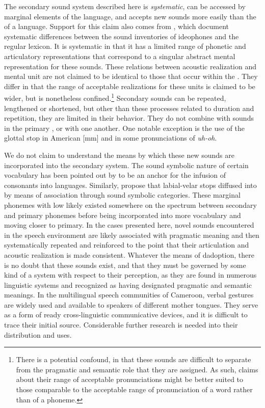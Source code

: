 \documentclass[output=paper
,newtxmath
,modfonts
,nonflat]{langsci/langscibook}
\begin{document}
The secondary sound system described here is \textit{systematic}, can be accessed by marginal elements of the language, and accepts new sounds more easily than the  of a language. Support for this claim also comes from \citet{nuckollsetal2016}, which document systematic differences between the sound inventories of  ideophones and the regular lexicon. It is systematic in that it has a limited range of phonetic and articulatory representations that correspond to a singular abstract mental representation for these sounds. These relations between acoustic realization and mental unit are not claimed to be identical to those that occur within the . They differ in that the range of acceptable realizations for these units is claimed to be wider, but is nonetheless confined.\footnote{There is a potential confound, in that these sounds are difficult to separate from the pragmatic and semantic role that they are assigned. As such, claims about their range of acceptable pronunciations might be better suited to those comparable to the acceptable range of pronunciation of a word rather than of a phoneme.} Secondary sounds can be repeated, lengthened or shortened, but other than these processes related to duration and repetition, they are limited in their behavior. They do not combine with sounds in the primary , or with one another. One notable exception is the use of the glottal stop in American  [\textglotstop m\textglotstop m] and in some pronunciations of \textit{uh-oh}.

We do not claim to understand the means by which these new sounds are incorporated into the secondary system. The sound symbolic nature of certain vocabulary has been pointed out by \citet{BostoenSands2012} to be an anchor for the infusion of  consonants into  languages. Similarly, \citet{BostoenDonzo2013} propose that labial-velar stops diffused into  by means of association through sound symbolic categories. These marginal phonemes with low  likely existed somewhere on the spectrum between secondary and primary phonemes before being incorporated into more vocabulary and moving closer to primary. In the cases presented here, novel sounds encountered in the speech environment are likely associated with pragmatic meaning and then systematically repeated and reinforced to the point that their articulation and acoustic realization is made consistent. Whatever the means of dadoption, there is no doubt that these sounds exist, and that they must be governed by some kind of a system with respect to their perception, as they are found in numerous linguistic systems and recognized as having designated pragmatic and semantic meanings. In the multilingual speech communities of Cameroon, verbal gestures are widely used and available to speakers of different mother tongues. They serve as a form of ready cross-linguistic communicative devices, and it is difficult to trace their initial source. Considerable further research is needed into their distribution and uses.\\
\vspace{2em}
\end{document}
